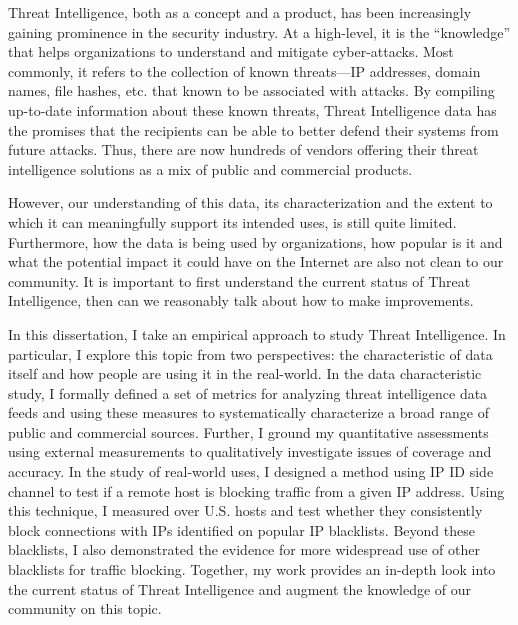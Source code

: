 \begin{dissertationabstract}

Threat Intelligence, both as a concept and a product, has been increasingly
gaining prominence in the security industry. At a high-level, it is the 
``knowledge'' that helps organizations to understand and mitigate cyber-attacks.
Most commonly, it refers to the collection of known threats---IP addresses, 
domain names, file hashes, etc. that known to be associated with attacks.
By compiling up-to-date information about these known threats, Threat 
Intelligence data has the promises that the recipients can be able to better 
defend their systems from future attacks. Thus, there are now hundreds of
vendors offering their threat intelligence solutions as a mix of public and
commercial products. 

However, our understanding of this data, its characterization and the
extent to which it can meaningfully support its intended uses, is
still quite limited. Furthermore, how the data is being used by
organizations, how popular is it and what the potential impact it 
could have on the Internet are also not clean to our community. 
It is important to first understand the current status of Threat 
Intelligence, then can we reasonably talk about how to make improvements.

In this dissertation, I take an empirical approach to study Threat 
Intelligence. In particular, I explore this topic from two perspectives:
the characteristic of data itself and how people are using it in the real-world.
In the data characteristic study, I formally defined a set of metrics for 
analyzing threat intelligence data feeds and using these measures to 
systematically characterize a broad range of public and commercial sources. 
Further, I ground my quantitative assessments using external measurements 
to qualitatively investigate issues of coverage and accuracy. In the study
of real-world uses, I designed a method using IP ID side channel to test 
if a remote host is blocking traffic from a given IP address. Using this
technique, I measured over {} U.S. hosts and test whether they 
consistently block connections with IPs identified on popular IP blacklists. 
Beyond these blacklists, I also demonstrated the evidence for more widespread 
use of other blacklists for traffic blocking. Together, my work provides
an in-depth look into the current status of Threat Intelligence and augment
the knowledge of our community on this topic.

\end{dissertationabstract}
